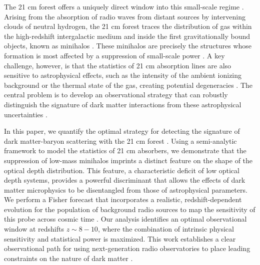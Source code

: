 \documentclass[]{article}
\begin{document}
The 21 cm forest offers a uniquely direct window into this small-scale regime \citep{sun2025deeplearningdrivenlikelihoodfreeparameter,Shao_2023,Shao_2025,zhao202621cmforestonedimensional}. Arising from the absorption of radio waves from distant sources by intervening clouds of neutral hydrogen, the 21 cm forest traces the distribution of gas within the high-redshift intergalactic medium and inside the first gravitationally bound objects, known as minihalos \citep{sun2025deeplearningdrivenlikelihoodfreeparameter,Shao_2023,thyagarajan2020statisticaldetectionigmstructures,Xu_2009,Furlanetto_2002}. These minihalos are precisely the structures whose formation is most affected by a suppression of small-scale power \citep{sun2025deeplearningdrivenlikelihoodfreeparameter,Shao_2023,zhao202621cmforestonedimensional,Furlanetto_2002}. A key challenge, however, is that the statistics of 21 cm absorption lines are also sensitive to astrophysical effects, such as the intensity of the ambient ionizing background or the thermal state of the gas, creating potential degeneracies \citep{sun2025deeplearningdrivenlikelihoodfreeparameter,Shao_2023,šoltinský2025prospectsstatisticaldetection21cm,Shao_2025,Xu_2009}. The central problem is to develop an observational strategy that can robustly distinguish the signature of dark matter interactions from these astrophysical uncertainties \citep{sun2025deeplearningdrivenlikelihoodfreeparameter,Shao_2023,zhao202621cmforestonedimensional}.

In this paper, we quantify the optimal strategy for detecting the signature of dark matter-baryon scattering with the 21 cm forest . Using a semi-analytic framework to model the statistics of 21 cm absorbers, we demonstrate that the suppression of low-mass minihalos imprints a distinct feature on the shape of the optical depth distribution. This feature, a characteristic deficit of low optical depth systems, provides a powerful discriminant that allows the effects of dark matter microphysics to be disentangled from those of astrophysical parameters. We perform a Fisher forecast that incorporates a realistic, redshift-dependent evolution for the population of background radio sources to map the sensitivity of this probe across cosmic time \citep{Plombat_2025,Rahimieh_2025}. Our analysis identifies an optimal observational window at redshifts $z \sim 8-10$, where the combination of intrinsic physical sensitivity and statistical power is maximized. This work establishes a clear observational path for using next-generation radio observatories to place leading constraints on the nature of dark matter \citep{Rahimieh_2026,Murakami_2024,Plombat_2025,Rahimieh_2025}.
\end{document}
